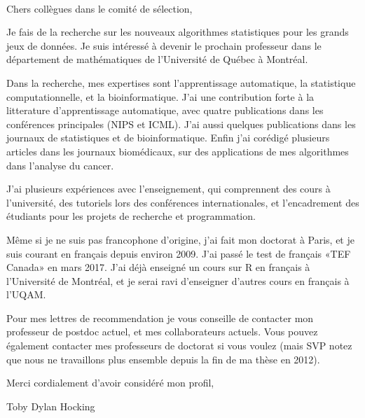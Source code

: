 \documentclass{article}
\begin{document}
\mbox{ }

Chers collègues dans le comité de sélection,

Je fais de la recherche sur les nouveaux algorithmes statistiques pour
les grands jeux de données. Je suis intéressé à devenir le prochain
professeur dans le département de mathématiques de l'Université de
Québec à Montréal.

Dans la recherche, mes expertises sont l'apprentissage automatique, la
statistique computationnelle, et la bioinformatique. J'ai une
contribution forte à la litterature d'apprentissage automatique, avec
quatre publications dans les conférences principales (NIPS et
ICML). J'ai aussi quelques publications dans les journaux de
statistiques et de bioinformatique. Enfin j'ai corédigé plusieurs
articles dans les journaux biomédicaux, sur des applications de mes
algorithmes dans l'analyse du cancer.
 
J'ai plusieurs expériences avec l'enseignement, qui comprennent des cours
à l'université, des tutoriels lors des conférences internationales, et
l'encadrement des étudiants pour les projets de recherche et
programmation.

Même si je ne suis pas francophone d'origine, j'ai fait mon doctorat à
Paris, et je suis courant en français depuis environ 2009. J'ai passé
le test de français «TEF Canada» en mars 2017. J'ai déjà enseigné un
cours sur R en français à l'Université de Montréal, et je serai ravi
d'enseigner d'autres cours en français à l'UQAM.

Pour mes lettres de recommendation je vous conseille de contacter mon
professeur de postdoc actuel, et mes collaborateurs actuels. Vous
pouvez également contacter mes professeurs de doctorat si vous voulez
(mais SVP notez que nous ne travaillons plus ensemble depuis la fin de
ma thèse en 2012).

Merci cordialement d'avoir considéré mon profil, 

Toby Dylan Hocking
\end{document}
